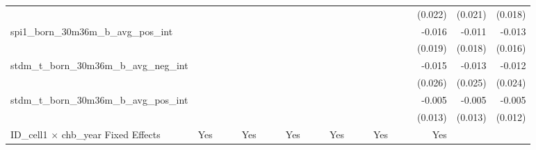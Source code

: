 \begin{tabular}{lrrrrrrrrrrrrrrrrrr}
                                            &              &              &              &              &              &              &              &              &               &              &              &               &              &              &               &      (0.022) &      (0.021) &       (0.018) \\ 
spi1\_born\_30m36m\_b\_avg\_pos\_int        &              &              &              &              &              &              &              &              &               &              &              &               &              &              &               &       -0.016 &       -0.011 &        -0.013 \\ 
                                            &              &              &              &              &              &              &              &              &               &              &              &               &              &              &               &      (0.019) &      (0.018) &       (0.016) \\ 
stdm\_t\_born\_30m36m\_b\_avg\_neg\_int     &              &              &              &              &              &              &              &              &               &              &              &               &              &              &               &       -0.015 &       -0.013 &        -0.012 \\ 
                                            &              &              &              &              &              &              &              &              &               &              &              &               &              &              &               &      (0.026) &      (0.025) &       (0.024) \\ 
stdm\_t\_born\_30m36m\_b\_avg\_pos\_int     &              &              &              &              &              &              &              &              &               &              &              &               &              &              &               &       -0.005 &       -0.005 &        -0.005 \\ 
                                            &              &              &              &              &              &              &              &              &               &              &              &               &              &              &               &      (0.013) &      (0.013) &       (0.012) \\ 
\midrule
ID\_cell1 $\times$ chb\_year Fixed Effects  &          Yes &              &              &          Yes &              &              &          Yes &              &               &          Yes &              &               &          Yes &              &               &          Yes &              &               \\ 

\end{tabular}
